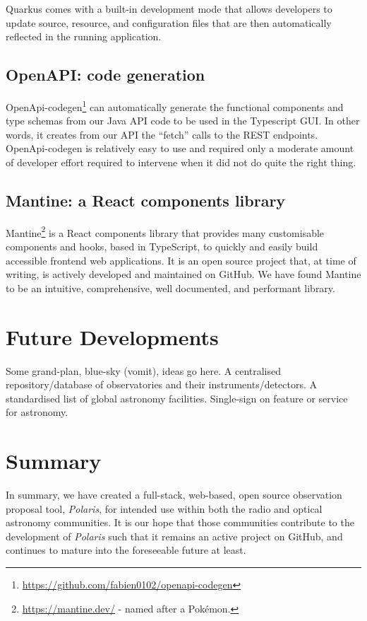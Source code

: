 \documentclass[11pt,twoside]{article}
\begin{document}
Quarkus comes with a built-in development mode that allows developers to update source, resource, and
configuration files that are then automatically reflected in the running application.

\subsection{OpenAPI: code generation}\label{subsec:openapi-code-generation}

OpenApi-codegen\footnote{\url{https://github.com/fabien0102/openapi-codegen}} can automatically generate
the functional components and type schemas from our Java API code to be used in the Typescript GUI\@.
In other words, it creates from our API the ``fetch'' calls to the REST endpoints.
OpenApi-codegen is relatively easy to use and required only a moderate amount of developer effort
required to intervene when it did not do quite the right thing.

\subsection{Mantine: a React components library}\label{subsec:mantine:-a-react-components-library}

Mantine\footnote{\url{https://mantine.dev/} - named after a Pok\'emon.} is a React components library that
provides many customisable components and hooks, based in TypeScript, to quickly and easily build accessible
frontend web applications.
It is an open source project that, at time of writing, is actively developed and maintained on GitHub.
We have found Mantine to be an intuitive, comprehensive, well documented, and performant library.

\section{Future Developments}\label{sec:future-developments}

Some grand-plan, blue-sky (vomit), ideas go here.
A centralised repository/database of observatories and their instruments/detectors.
A standardised list of global astronomy facilities.
Single-sign on feature or service for astronomy.

\section{Summary}\label{sec:summary}
In summary, we have created a full-stack, web-based, open source observation proposal tool, \emph{Polaris},
for intended use within both the radio and optical astronomy communities.
It is our hope that those communities contribute to the development of \emph{Polaris} such that it remains an
active project on GitHub, and continues to mature into the foreseeable future at least.
\end{document}
